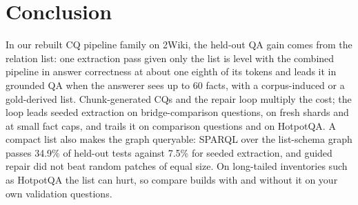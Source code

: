\section{Conclusion}
\label{sec:conclusion}

In our rebuilt CQ pipeline family on 2Wiki, the held-out QA gain comes from the relation list: one extraction pass given only the list is level with the combined pipeline in answer correctness at about one eighth of its tokens and leads it in grounded QA when the answerer sees up to 60 facts, with a corpus-induced or a gold-derived list. Chunk-generated CQs and the repair loop multiply the cost; the loop leads seeded extraction on bridge-comparison questions, on fresh shards and at small fact caps, and trails it on comparison questions and on HotpotQA. A compact list also makes the graph queryable: SPARQL over the list-schema graph passes 34.9\% of held-out tests against 7.5\% for seeded extraction, and guided repair did not beat random patches of equal size. On long-tailed inventories such as HotpotQA the list can hurt, so compare builds with and without it on your own validation questions.
